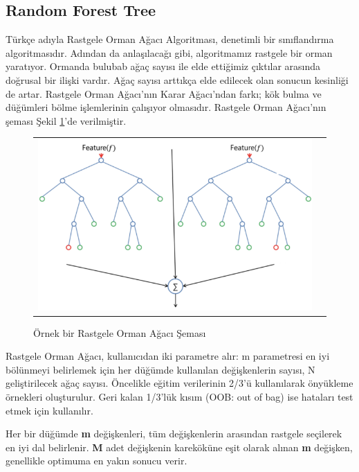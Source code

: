 \documentclass[conference]{IEEEtran}
\begin{document}
\subsection{\textbf{Random Forest Tree}}
\quad Türkçe adıyla Rastgele Orman Ağacı Algoritması, denetimli bir sınıflandırma algoritmasıdır. Adından da anlaşılacağı gibi, algoritmamız rastgele bir orman yaratıyor. Ormanda bulubab ağaç sayısı ile elde ettiğimiz çıktılar arasında doğrusal bir ilişki vardır. Ağaç sayısı arttıkça elde edilecek olan sonucun kesinliği de artar. Rastgele Orman Ağacı’nın Karar Ağacı’ndan farkı; kök bulma ve düğümleri bölme işlemlerinin çalışıyor olmasıdır\cite{19}. Rastgele Orman Ağacı’nın şeması Şekil \ref{fig:07}'de verilmiştir.

\begin{figure}[!h]
	\centering%
	\begin{center}
		\begin{tabular}{cc}%
			\includegraphics[scale=0.45]{pictures/pic_07.png}&%
		\end{tabular}%
	\end{center}
	\caption{Örnek bir Rastgele Orman Ağacı Şeması\cite{20}}%
	\label{fig:07}
\end{figure}

\quad Rastgele Orman Ağacı, kullanıcıdan iki parametre alır: m parametresi en iyi bölünmeyi belirlemek için her düğümde kullanılan değişkenlerin sayısı, N geliştirilecek ağaç sayısı. Öncelikle eğitim verilerinin 2/3'ü kullanılarak önyükleme örnekleri oluşturulur. Geri kalan 1/3'lük kısım (OOB: out of bag) ise hataları test etmek için kullanılır\cite{21}.

\quad Her bir düğümde \textbf{m} değişkenleri, tüm değişkenlerin arasından rastgele seçilerek en iyi dal belirlenir. \textbf{M} adet değişkenin kareköküne eşit olarak alınan \textbf{m} değişken, genellikle optimuma en yakın sonucu verir\cite{21}.
\end{document}
